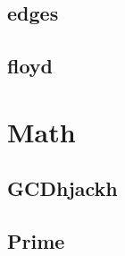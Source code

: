     \subsection{edges}
            
    \subsection{floyd}
        

\section{Math}
    \subsection{GCDhjackh}
        
    \subsection{Prime}
        